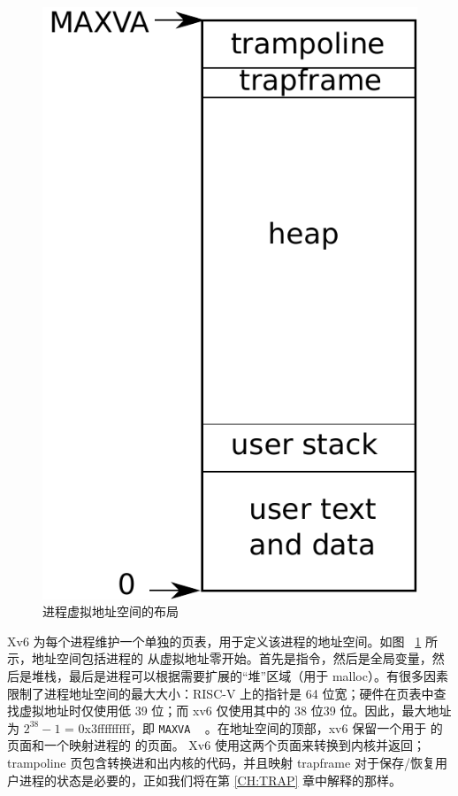 \documentclass[UTF8]{article}
\begin{document}
   \begin{figure}[t]
\centering
\includegraphics[scale=0.5]{fig/as.pdf}
\caption{进程虚拟地址空间的布局  }
\label{fig:as}
\end{figure}     

Xv6 为每个进程维护一个单独的页表，用于定义该进程的地址空间。如图~   \ref{fig:as}   所示，地址空间包括进程的
        从虚拟地址零开始。首先是指令，然后是全局变量，然后是堆栈，最后是进程可以根据需要扩展的“堆”区域（用于 malloc）。有很多因素限制了进程地址空间的最大大小：RISC-V 上的指针是 64 位宽；硬件在页表中查找虚拟地址时仅使用低 39 位；而 xv6 仅使用其中的 38 位39 位。因此，最大地址为    $2^{38}-1$    = 0x3fffffffff，即    \lstinline{MAXVA}    ~        。在地址空间的顶部，xv6 保留一个用于        的页面和一个映射进程的        的页面。 Xv6 使用这两个页面来转换到内核并返回；trampoline 页包含转换进和出内核的代码，并且映射 trapframe 对于保存/恢复用户进程的状态是必要的，正如我们将在第    \ref{CH:TRAP}    章中解释的那样。  
\end{document}
